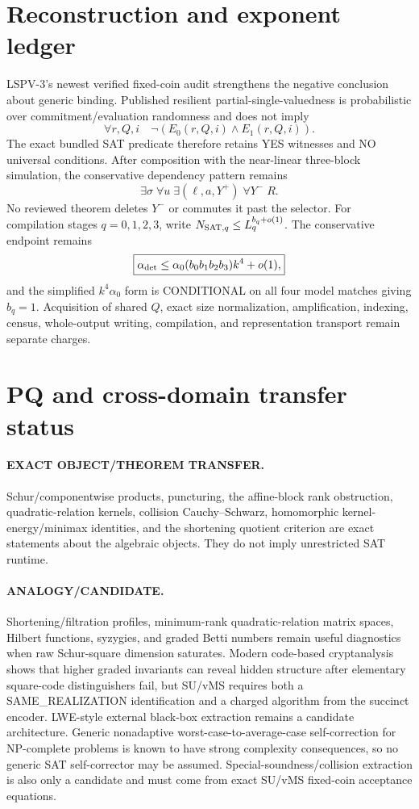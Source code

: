 \documentclass[11pt]{article}
\begin{document}
\section*{Reconstruction and exponent ledger}
LSPV-3's newest verified fixed-coin audit strengthens the negative conclusion about generic binding. Published resilient partial-single-valuedness is probabilistic over commitment/evaluation randomness and does not imply
\[ \forall r,Q,i\quad \neg(E_0(r,Q,i)\wedge E_1(r,Q,i)). \]
The exact bundled SAT predicate therefore retains YES witnesses and NO universal conditions. After composition with the near-linear three-block simulation, the conservative dependency pattern remains
\[ \boxed{\exists\sigma\;\forall u\;\exists(\ell,a,Y^+)\;\forall Y^-\;R.} \]
No reviewed theorem deletes \(Y^-\) or commutes it past the selector.
For compilation stages \(q=0,1,2,3\), write \(N_{{\rm SAT},q}\le L_q^{b_q+o(1)}\). The conservative endpoint remains
\[ \boxed{\alpha_{\rm det}\le \alpha_0(b_0b_1b_2b_3)k^4+o(1),} \]
and the simplified \(k^4\alpha_0\) form is CONDITIONAL on all four model matches giving \(b_q=1\). Acquisition of shared \(Q\), exact size normalization, amplification, indexing, census, whole-output writing, compilation, and representation transport remain separate charges.

\section*{PQ and cross-domain transfer status}
\paragraph{EXACT OBJECT/THEOREM TRANSFER.} Schur/componentwise products, puncturing, the affine-block rank obstruction, quadratic-relation kernels, collision Cauchy--Schwarz, homomorphic kernel-energy/minimax identities, and the shortening quotient criterion are exact statements about the algebraic objects. They do not imply unrestricted SAT runtime.
\paragraph{ANALOGY/CANDIDATE.} Shortening/filtration profiles, minimum-rank quadratic-relation matrix spaces, Hilbert functions, syzygies, and graded Betti numbers remain useful diagnostics when raw Schur-square dimension saturates. Modern code-based cryptanalysis shows that higher graded invariants can reveal hidden structure after elementary square-code distinguishers fail, but SU/vMS requires both a SAME\_REALIZATION identification and a charged algorithm from the succinct encoder. LWE-style external black-box extraction remains a candidate architecture. Generic nonadaptive worst-case-to-average-case self-correction for NP-complete problems is known to have strong complexity consequences, so no generic SAT self-corrector may be assumed. Special-soundness/collision extraction is also only a candidate and must come from exact SU/vMS fixed-coin acceptance equations.
\end{document}
